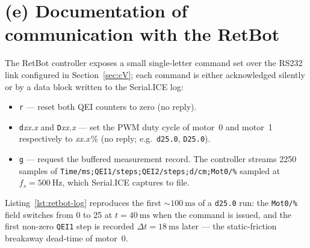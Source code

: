 \documentclass[12pt, oneside, a4paper]{scrreprt}
\begin{document}
    
        \section{(e) Documentation of communication with the RetBot}
            
            The RetBot controller exposes a small single-letter command set over the RS232 link configured in Section~\ref{sec:cV}; each command is either acknowledged silently or by a data block written to the Serial.ICE log:
            \begin{itemize}
                \item \texttt{r} --- reset both QEI counters to zero (no reply).
                \item \texttt{d}\textit{xx.x} and \texttt{D}\textit{xx.x} --- set the PWM duty cycle of motor~0 and motor~1 respectively to \textit{xx.x}\,\% (no reply; e.g.\ \texttt{d25.0}, \texttt{D25.0}).
                \item \texttt{g} --- request the buffered measurement record. The controller streams 2250 samples of \texttt{Time/ms;QEI1/steps;QEI2/steps;d/cm;Mot0/\%} sampled at $f_s = \SI{500}{\hertz}$, which Serial.ICE captures to file.
            \end{itemize}
            Listing~\ref{lst:retbot-log} reproduces the first $\sim\!\SI{100}{\milli\second}$ of a \texttt{d25.0} run: the \texttt{Mot0/\%} field switches from 0 to 25 at $t = \SI{40}{\milli\second}$ when the command is issued, and the first non-zero \texttt{QEI1} step is recorded $\Delta t = \SI{18}{\milli\second}$ later --- the static-friction breakaway dead-time of motor~0.
\end{document}
